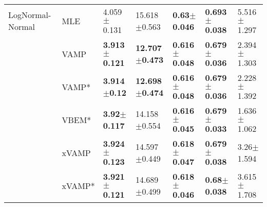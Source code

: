 \begin{tabular}{lllllll}
LogNormal-Normal & MLE &           4.059$\pm$0.131 &           15.618$\pm$0.563 &   \textbf{0.63$\pm$0.046} &  \textbf{0.693$\pm$0.038} &           5.516$\pm$1.297 \\
                 & VAMP &  \textbf{3.913$\pm$0.121} &  \textbf{12.707$\pm$0.473} &  \textbf{0.616$\pm$0.048} &  \textbf{0.679$\pm$0.036} &           2.394$\pm$1.303 \\
                 & VAMP* &   \textbf{3.914$\pm$0.12} &  \textbf{12.698$\pm$0.474} &  \textbf{0.616$\pm$0.048} &  \textbf{0.679$\pm$0.036} &           2.228$\pm$1.392 \\
                 & VBEM* &   \textbf{3.92$\pm$0.117} &           14.158$\pm$0.554 &  \textbf{0.616$\pm$0.045} &  \textbf{0.679$\pm$0.033} &           1.636$\pm$1.062 \\
                 & xVAMP &  \textbf{3.924$\pm$0.123} &           14.597$\pm$0.449 &  \textbf{0.618$\pm$0.047} &  \textbf{0.679$\pm$0.038} &            3.26$\pm$1.594 \\
                 & xVAMP* &  \textbf{3.921$\pm$0.121} &           14.689$\pm$0.499 &  \textbf{0.618$\pm$0.046} &   \textbf{0.68$\pm$0.038} &           3.615$\pm$1.708 \\
\bottomrule
\end{tabular}

